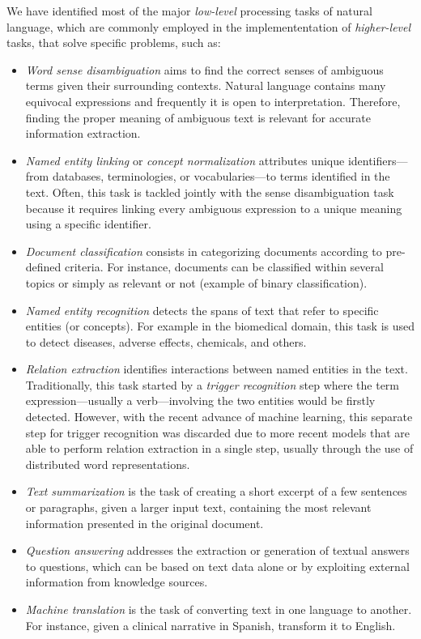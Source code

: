 We have identified most of the major \textit{low-level} processing tasks of natural language, which are commonly employed in the implemententation of \textit{higher-level} tasks, that solve specific problems, such as:

\begin{itemize}

\item
\textit{Word sense disambiguation} aims to find the correct senses of ambiguous terms given their surrounding contexts. Natural language contains many equivocal expressions and frequently it is open to interpretation. Therefore, finding the proper meaning of ambiguous text is relevant for accurate information extraction.

\item
\textit{Named entity linking} or \textit{concept normalization} attributes unique identifiers---from databases, terminologies, or vocabularies---to terms identified in the text. Often, this task is tackled jointly with the sense disambiguation task because it requires linking every ambiguous expression to a unique meaning using a specific identifier.

\item
\textit{Document classification} consists in categorizing documents according to pre-defined criteria. For instance, documents can be classified within several topics or simply as relevant or not (example of binary classification).

\item
\textit{Named entity recognition} detects the spans of text that refer to specific entities (or concepts). For example in the biomedical domain, this task is used to detect diseases, adverse effects, chemicals, and others.

\item
\textit{Relation extraction} identifies interactions between named entities in the text. Traditionally, this task started by a \textit{trigger recognition} step where the term expression---usually a verb---involving the two entities would be firstly detected. However, with the recent advance of machine learning, this separate step for trigger recognition was discarded due to more recent  models that are able to perform relation extraction in a single step, usually through the use of distributed word representations.

\item
\textit{Text summarization} is the task of creating a short excerpt of a few sentences or paragraphs, given a larger input text, containing the most relevant information presented in the original document.

\item
\textit{Question answering} addresses the extraction or generation of textual answers to questions, which can be based on text data alone or by exploiting external information from knowledge sources.

\item
\textit{Machine translation} is the task of converting text in one language to another. For instance, given a clinical narrative in Spanish, transform it to English.

\end{itemize}

